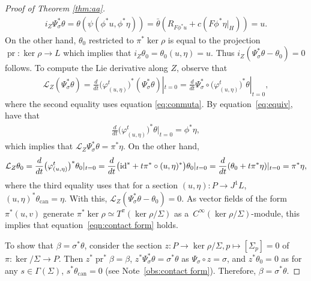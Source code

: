 \documentclass[pdftex]{sigma}
\numberwithin{equation}{section}
\newcommand{\pr}{\operatorname{pr}}
\begin{document}
\begin{proof}[Proof of Theorem \ref{thm:aa}]
\begin{gather*}
 i_Z\Psi^*_\sigma\theta=\theta(\psi(\phi^*u,\phi^*\eta))=\bar\theta(R_{F\phi^*u}+c(F\phi^*\eta|_H))=u.
\end{gather*}
On the other hand, $\theta_0$ restricted to $\pi^*\ker\rho$ is equal to the projection $\pr\colon \ker\rho\to L$ which implies that $i_Z\theta_0=\theta_{0}(u,\eta)=u$. Thus $i_Z(\Psi_\sigma^*\theta-\theta_0)=0$ follows. To compute the Lie derivative along $Z$, observe that
\begin{gather*}
 \mathcal{L}_Z(\Psi^*_\sigma\theta )= \frac{d}{dt}\big(\varphi^t_{(u,\eta)}\big)^*(\Psi^*_\sigma\theta)|_{t=0} =\frac{d}{dt}\Psi^*_\sigma\circ
\big(\varphi^t_{(u,\eta)}\big)^*\theta|_{t=0},
\end{gather*}
where the second equality uses equation \eqref{eq:conmuta}. By equation~\eqref{eq:equiv}, have that
\begin{gather*}
 \frac{d}{dt}\big(\varphi^t_{(u,\eta)}\big)^*\theta|_{t=0}=\phi^*\eta,
\end{gather*}
which implies that $\mathcal{L}_Z\Psi^*_\sigma\theta=\pi^*\eta$. On the other hand,
\begin{gather*} \mathcal{L}_Z\theta_0=\frac{d}{dt}\big(\varphi^t_{(u,\eta)}\big)^*\theta_0|_{t=0}=\frac{d}{dt}\big({\rm id}^*+t\pi^*\circ(u,\eta)^*\big)\theta_0|_{t=0}=\frac{d}{dt}(\theta_0+t\pi^*\eta)|_{t=0}=\pi^*\eta,
\end{gather*}
where the third equality uses that for a section $(u,\eta)\colon P\to J^1L$, $(u,\eta)^*\theta_{\mathrm{can}}=\eta$. With this, $\mathcal{L}_Z(\Psi_\sigma^*\theta-\theta_0)=0$. As vector f\/ields of the form $\pi^*(u,v)$ generate $\pi^*\ker\rho\simeq T^\pi(\ker\rho/\Sigma)$ as a~$C^\infty(\ker\rho/\Sigma)$-module, this implies that equation~\eqref{eqn:contact form} holds.

To show that $\beta=\sigma^*\theta$, consider the section $z\colon P\to \ker\rho/\Sigma, p\mapsto [\Sigma_p]=0$ of $\pi\colon \ker/\Sigma\to P$. Then $z^*\operatorname{pr}^*\beta=\beta$, $z^*\Psi_\sigma^*\theta=\sigma^*\theta$ as $\Psi_\sigma\circ z=\sigma$, and $z^*\theta_0=0$ as for any $s\in\Gamma(\Sigma)$, $s^*\theta_{\mathrm{can}}=0$ (see Note~\ref{obs:contact form}). Therefore, $\beta=\sigma^*\theta$.


\end{proof}
\end{document}
